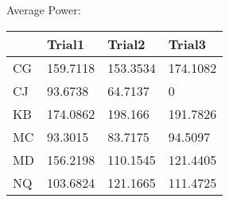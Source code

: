 \documentclass[preview]{standalone}
\begin{document}
Average Power:
\begin{tabular}{llll}
       & Trial1   & Trial2   & Trial3   \\
    \hline
    CG & 159.7118 & 153.3534 & 174.1082 \\
    CJ & 93.6738  & 64.7137  & 0        \\
    KB & 174.0862 & 198.166  & 191.7826 \\
    MC & 93.3015  & 83.7175  & 94.5097  \\
    MD & 156.2198 & 110.1545 & 121.4405 \\
    NQ & 103.6824 & 121.1665 & 111.4725 \\
    \hline
\end{tabular}
\end{document}
